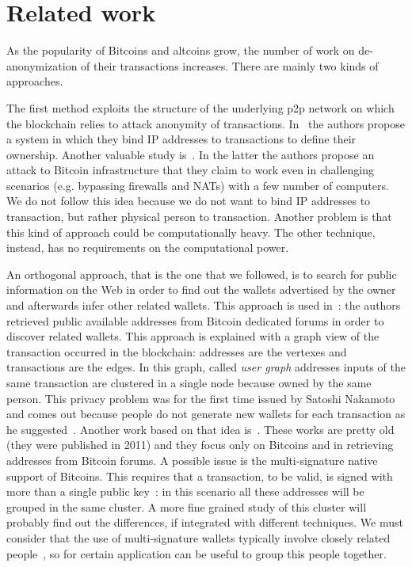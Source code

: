 \section{Related work} \label{relworks}
As the popularity of Bitcoins and altcoins grow, the number of work on
de-anonymization of their transactions increases.
There are mainly two kinds of approaches.

The first method exploits the structure of the underlying p2p network on which
the blockchain relies to attack anonymity of transactions.
In~\cite{bib:anonBitcoin} the authors propose a system in which they bind IP
addresses to transactions to define their ownership. Another
valuable study is~\cite{bib:deanonP2P}. In the latter the authors propose an
attack to Bitcoin infrastructure that they claim to work even in challenging
scenarios (e.g. bypassing firewalls and NATs) with a few number of computers.
We do not follow this idea because we do not want to bind IP addresses to
transaction, but rather physical person to transaction. Another problem is that
this kind of approach could be computationally heavy. The other technique,
instead, has no requirements on the computational power.

An orthogonal approach, that is the one that we followed, is to search for
public information on the Web in order to find out the wallets advertised
by the owner and afterwards infer other related wallets. This approach is used
in~\cite{bib:anonAnalysis}: the authors retrieved public available addresses
from Bitcoin dedicated forums in order to discover related wallets. This
approach is explained with a graph view of the transaction occurred in the
blockchain: addresses are the vertexes and transactions are the edges. In this
graph, called \textit{user graph} addresses inputs of the same transaction are
clustered in a single node because owned by the same person. This privacy
problem was for the first time issued by Satoshi Nakamoto and comes out
because people do not generate new wallets for each transaction as he
suggested~\cite{bib:satoshi}. Another work based on that idea
is~\cite{bib:fistful}.
These works are pretty old (they were published in 2011) and they focus only on
Bitcoins and in retrieving addresses from Bitcoin forums. A possible issue is
the multi-signature native support of Bitcoins. This requires that a
transaction, to be valid, is signed with more than a single public
key~\cite{bib:multisignature}: in this scenario all these addresses will be
grouped in the same cluster. A more fine grained study of this cluster will
probably find out the differences, if integrated with different techniques. We
must consider that the use of multi-signature wallets typically involve closely
related people~\cite{bib:multisignaturebitcoinwiki}, so for certain application
can be useful to group this people together.

